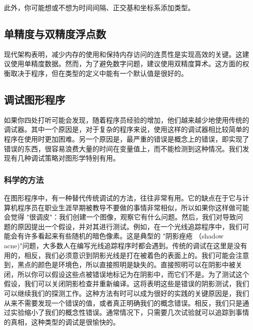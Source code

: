 \documentclass[lang=cn,12pt]{elegantbook}
\begin{document}
此外，你可能想或不想为时间间隔、正交基和坐标系添加类型。


\subsection{单精度与双精度浮点数}

现代架构表明，减少内存的使用和保持内存访问的连贯性是实现高效的关键。这建议使用单精度数据。然而，为了避免数字问题，建议使用双精度算术。这方面的权衡取决于程序，但在类型的定义中能有一个默认值是很好的。


\subsection{调试图形程序}

如果你四处打听可能会发现，随着程序员经验的增加，他们越来越少地使用传统的调试器。其中一个原因是，对于复杂的程序来说，使用这样的调试器相比较简单的程序在使用时更加困难。另一个原因是，最严重的错误是概念上的错误，即实现了错误的东西，很容易浪费大量的时间在变量值上，而不能检测到这种情况。我们发现有几种调试策略对图形学特别有用。


\subsubsection{科学的方法}

在图形程序中，有一种替代传统调试的方法，往往非常有用。它的缺点在于它与计算机程序员在职业生涯早期被教导不要做的事情非常相似，所以如果你这样做可能会觉得 "很调皮"：我们创建一个图像，观察它有什么问题。然后，我们对导致问题的原因提出一个假设，并对其进行测试。例如，在一个光线追踪程序中，我们可能会有许多看起来有些随机的暗色像素。这是典型的 "阴影痤疮 （shadow acne)"问题，大多数人在编写光线追踪程序时都会遇到。传统的调试在这里是没有用的，相反，我们必须意识到阴影光线是打在被着色的表面上的。我们可能会注意到，黑点的颜色是环境色，所以直接照明是缺失的。直接照明可以在阴影中被关闭，所以你可以假设这些点被错误地标记为在阴影中，而它们不是。为了测试这个假设，我们可以关闭阴影检查并重新编译。这将表明这些是错误的阴影测试，我们可以继续我们的探测工作。这种方法有时可以成为很好的实践的关键原因是，我们从来不需要发现一个错误的值，或者真正明确我们的概念错误。相反，我们只是通过实验缩小了我们的概念性错误。通常情况下，只需要几次试验就可以追踪到事情的真相，这种类型的调试是很愉快的。
\end{document}
